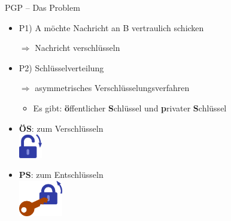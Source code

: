 \documentclass{beamer}
\begin{document}
\begin{frame}[label=bg2]{PGP – Das Problem}
  
  \begin{itemize}
   \item P1) A möchte Nachricht an B vertraulich schicken\\
   \item[$\Rightarrow$] Nachricht verschlüsseln

   \pause

   \vspace*{.5\baselineskip}

   \item P2) Schlüsselverteilung\\
   \item[$\Rightarrow$] asymmetrisches Verschlüsselungsverfahren
   \begin{itemize}
    \item Es gibt: \textbf{ö}ffentlicher \textbf{S}chlüssel und \textbf{p}rivater \textbf{S}chlüssel
   \end{itemize}
   
   \pause

   \vspace*{.5\baselineskip}

   \item \textbf{ÖS}: zum Verschlüsseln\\
   {\vspace*{4mm}\hspace{10mm}\includegraphics[width=10mm]{img-src/padlock-lock}}
   
   
   \item \textbf{PS}: zum Entschlüsseln\\
   {\vspace*{4mm}\hspace{10mm}\includegraphics[width=19mm]{img-src/padlock-unlock-with-key}}

  \end{itemize}


\end{frame}
\end{document}
